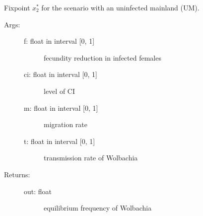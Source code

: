 \documentclass[letterpaper,10pt,english]{sphinxmanual}
\begin{document}
\begin{fulllineitems}
\label{index:wspec.analytical.fix2_UM}
Fixpoint $x_2^{\ast}$ for the scenario with an uninfected mainland (UM).
\begin{description}
\item[{Args:}] \leavevmode\begin{description}
\item[{f: float in interval {[}0, 1{]}}] \leavevmode
fecundity reduction in infected females

\item[{ci: float in interval {[}0, 1{]}}] \leavevmode
level of CI

\item[{m: float in interval {[}0, 1{]}}] \leavevmode
migration rate

\item[{t: float in interval {[}0, 1{]}}] \leavevmode
transmission rate of Wolbachia

\end{description}

\item[{Returns:}] \leavevmode\begin{description}
\item[{out: float}] \leavevmode
equilibrium frequency of Wolbachia

\end{description}

\end{description}

\end{fulllineitems}

\end{document}

